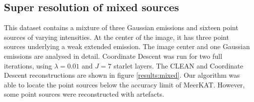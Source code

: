 
\subsection{Super resolution of mixed sources}
This dataset contains a mixture of three Gaussian emissions and sixteen point sources of varying intensities. At the center of the image, it has three point sources underlying a weak extended emission. The image center and one Gaussian emissions are analysed in detail. Coordinate Descent was run for two full iterations, using  $\lambda=0.01$ and $J=7$ starlet layers. The CLEAN and Coordinate Descent reconstructions are shown in figure \ref{results:mixed}. Our algorithm was able to locate the point sources below the accuracy limit of MeerKAT. However, some point sources were reconstructed with artefacts.

